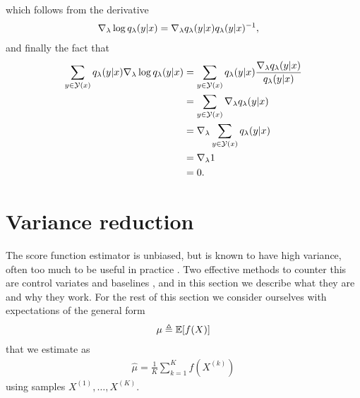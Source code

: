   which follows from the derivative
  \begin{align*}
    \nabla_{\lambda}\log q_{\lambda}(y | x) &= \nabla_{\lambda} q_{\lambda}(y | x)q_{\lambda}(y | x)^{-1},
  \end{align*}
  and finally the fact that
  \begin{align*}
    \sum_{y \in \mathcal{Y}(x)} q_{\lambda}(y | x)\nabla_{\lambda}\log q_{\lambda}(y | x)
      &= \sum_{y \in \mathcal{Y}(x)}  q_{\lambda}(y | x) \frac{\nabla_{\lambda} q_{\lambda}(y | x)}{q_{\lambda}(y | x)}  \\
      &= \sum_{y \in \mathcal{Y}(x)} \nabla_{\lambda} q_{\lambda}(y | x) \\
      &= \nabla_{\lambda} \sum_{y \in \mathcal{Y}(x)} q_{\lambda}(y | x)\\
      &= \nabla_{\lambda} 1 \\
      &= 0. \\
  \end{align*}

\section{Variance reduction}
  The  score function estimator is unbiased, but is known to have high variance, often too much to be useful in practice \citep{paisley2012viss}. Two effective methods to counter this are control variates and baselines \citep{ross2006simulation}, and in this section we describe what they are and why they work. For the rest of this section we consider ourselves with expectations of the general form
  \begin{align*}
    \mu \triangleq \operatorname{\mathbb{E}} [ f(X) ]
  \end{align*}
  that we estimate as
  \begin{align*}
    \hat{\mu} = \frac{1}{K} \sum_{k=1}^K f(X^{(k)})
  \end{align*}
  using samples $X^{(1)}, \dots, X^{(K)}$.

